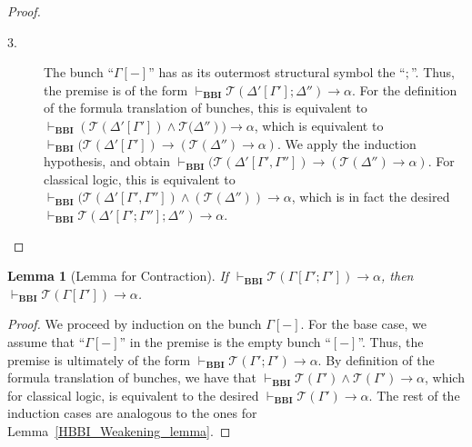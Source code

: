 \documentclass[a4paper]{article}
\newtheorem{lemma}[theorem]{Lemma}
\newcommand{\BBI}{\textbf{BBI}\xspace}
\begin{document}
\begin{proof}
\begin{description}
\item[3.] The bunch “$\Gamma[-]$'' has as its outermost structural symbol the “$;$''. Thus, the premise is of the form $\vdash_{\BBI}\mathcal{T}(\Delta'[\Gamma']; \Delta'')\rightarrow \alpha$. For the definition of the formula translation of bunches, this is equivalent to $\vdash_{\BBI}(\mathcal{T}(\Delta'[\Gamma']) \land \mathcal{T(}\Delta''))\rightarrow \alpha$, which is equivalent to $\vdash_{\BBI}(\mathcal{T}(\Delta'[\Gamma']) \rightarrow (\mathcal{T}(\Delta'')\rightarrow \alpha)$. We apply the induction hypothesis, and obtain $\vdash_{\BBI}(\mathcal{T}(\Delta'[\Gamma', \Gamma'']) \rightarrow (\mathcal{T}(\Delta'')\rightarrow \alpha)$. For classical logic, this is equivalent to $\vdash_{\BBI}(\mathcal{T}(\Delta'[\Gamma', \Gamma'']) \land (\mathcal{T}(\Delta''))\rightarrow \alpha$, which is in fact the desired $\vdash_{\BBI}\mathcal{T}(\Delta'[\Gamma'; \Gamma''];\Delta'')\rightarrow \alpha$.
    
\end{description}
\end{proof}


\begin{lemma}[Lemma for Contraction]\label{HBBI_Contraction_lemma} If $\vdash_{\BBI}\mathcal{T}(\Gamma[\Gamma'; \Gamma'])\rightarrow \alpha$, then $\vdash_{\BBI}\mathcal{T}(\Gamma[\Gamma'])\rightarrow \alpha$.
    
\end{lemma}

\begin{proof}
 We proceed by induction on the bunch $\Gamma[-]$. For the base case, we assume that “$\Gamma[-]$'' in the premise is the empty bunch “$[-]$''. Thus, the premise is ultimately of the form $\vdash_{\BBI}\mathcal{T}(\Gamma'; \Gamma')\rightarrow \alpha$. By definition of the formula translation of bunches, we have that $\vdash_{\BBI}\mathcal{T}(\Gamma') \land \mathcal{T}(\Gamma')\rightarrow \alpha$, which for classical logic, is equivalent to the desired $\vdash_{\BBI}\mathcal{T}(\Gamma')\rightarrow \alpha$. The rest of the induction cases are analogous to the ones for Lemma~\ref{HBBI_Weakening_lemma}. 
   
\end{proof}
\end{document}
